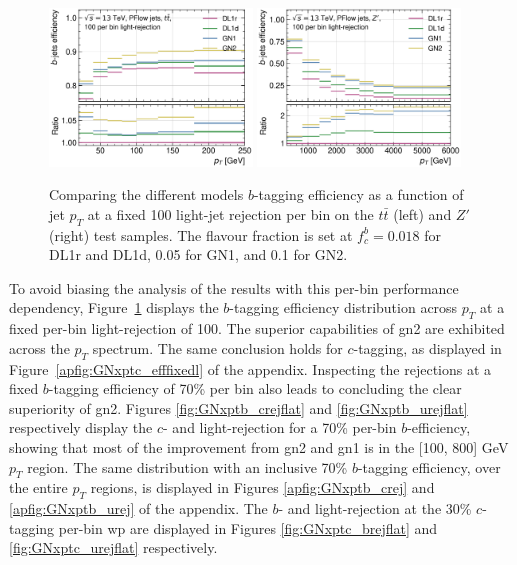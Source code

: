 \begin{figure}[h!]
  \centering
  \includegraphics[width=0.48\textwidth]{Images/FTAG/GN/GN2/pt_plots/pt_ttbar_b_eff_fixedlight.png}
  \includegraphics[width=0.48\textwidth]{Images/FTAG/GN/GN2/pt_plots/pt_zp_b_eff_fixedlight.png}
  \caption{Comparing the different models $b$-tagging efficiency as a function of jet $p_T$ at a fixed 100 light-jet rejection per bin on the $t\bar{t}$ (left) and $Z'$ (right) test samples. The flavour fraction is set at $f^b_c = 0.018$ for DL1r and DL1d, 0.05 for GN1, and 0.1 for GN2.}
  \label{fig:GNxptb_efffixedl}
\end{figure} 

To avoid biasing the analysis of the results with this per-bin performance dependency, Figure~\ref{fig:GNxptb_efffixedl} displays the $b$-tagging efficiency distribution across $p_T$ at a fixed per-bin light-rejection of 100. The superior capabilities of \gls{gn2} are exhibited across the $p_T$ spectrum. The same conclusion holds for $c$-tagging, as displayed in Figure~\ref{apfig:GNxptc_efffixedl} of the appendix. Inspecting the rejections at a fixed $b$-tagging efficiency of 70\% per bin also leads to concluding the clear superiority of \gls{gn2}. Figures \ref{fig:GNxptb_crejflat} and \ref{fig:GNxptb_urejflat} respectively display the $c$- and light-rejection for a 70\% per-bin $b$-efficiency, showing that most of the improvement from \gls{gn2} and \gls{gn1} is in the [100, 800] GeV $p_T$ region. The same distribution with an inclusive 70\% $b$-tagging efficiency, over the entire $p_T$ regions, is displayed in Figures \ref{apfig:GNxptb_crej} and \ref{apfig:GNxptb_urej} of the appendix. The $b$- and light-rejection at the 30\% $c$-tagging per-bin \gls{wp} are displayed in Figures \ref{fig:GNxptc_brejflat} and \ref{fig:GNxptc_urejflat} respectively. \\

